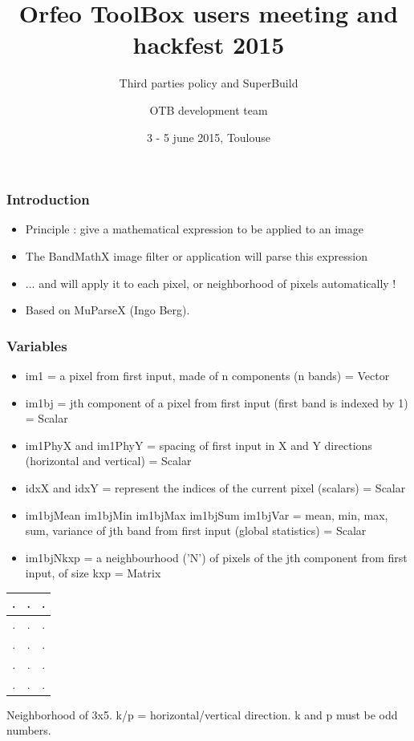 \documentclass[8pt]{beamer}
\title{Orfeo ToolBox users meeting and hackfest 2015}
\subtitle{Third parties policy and SuperBuild}
\author{OTB development team}%
\date{3 - 5 june 2015, Toulouse}
\begin{document}
\begin{frame}
\titlepage
\end{frame}

\begin{frame}
\frametitle{Introduction}

\begin{itemize}
\item Principle : give a mathematical expression to be applied to an image
\item The BandMathX image filter or application will parse this expression
\item ... and will apply it to each pixel, or neighborhood of pixels automatically !
\item Based on MuParseX (Ingo Berg).
\end{itemize} 

\end{frame}

\begin{frame}
\frametitle{Variables}

\begin{itemize}
\item im1 =  a pixel from first input, made of n components (n bands) = Vector
\item im1bj = jth component of a pixel from first input (first band is indexed by 1) = Scalar
\item im1PhyX and im1PhyY = spacing of first input in X and Y directions (horizontal and vertical) = Scalar 
\item idxX and idxY = represent the indices of the current pixel (scalars) = Scalar
\item im1bjMean  im1bjMin  im1bjMax  im1bjSum  im1bjVar  = mean,  min,  max,  sum,  variance  of  jth band from first input (global statistics) = Scalar
\item im1bjNkxp = a neighbourhood (’N’) of pixels of the jth component from first input, of size kxp = Matrix 
\end{itemize}

\begin{center} 
\begin{tabular}{|c|c|c|}
\hline
.	& .	& . \\
\hline
.	& .	& . \\
\hline
.	& .	& . \\
\hline
.	& .	& . \\
\hline
.	& .	& . \\
\hline
\end{tabular}
\end{center}
\begin{center} 
Neighborhood of 3x5. k/p = horizontal/vertical direction. k and p must be odd numbers.
\end{center}

\end{frame}
\end{document}
